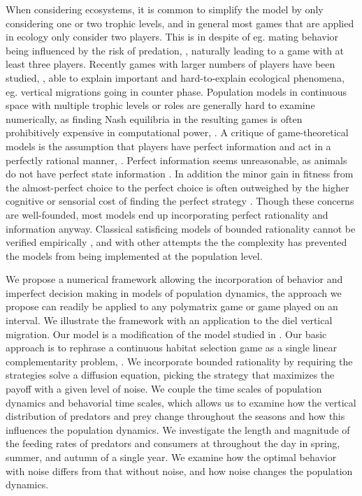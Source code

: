 When considering ecosystems, it is common to simplify the model by only considering one or two trophic levels, and in general most games that are applied in ecology only consider two players. This is in despite of eg. mating behavior being influenced by the risk of predation, \citep{carranza1999red,lima2009predators}, naturally leading to a game with at least three players. Recently games with larger numbers of players have been studied, \citep{pinti2019trophic}, able to explain important and hard-to-explain ecological phenomena, eg. vertical migrations going in counter phase. Population models in continuous space with multiple trophic levels or roles are generally hard to examine numerically, as finding Nash equilibria in the resulting games is often prohibitively expensive in computational power, \citep{empirical_trait,pinti2019trophic}. A critique of game-theoretical models is the assumption that players have perfect information and act in a perfectly rational manner, \citep{jones1999bounded}. Perfect information seems unreasonable, as animals do not have perfect state information \citep{simon1955behavioral}. In addition the minor gain in fitness from the almost-perfect choice to the perfect choice is often outweighed by the higher cognitive or sensorial cost of finding the perfect strategy \citep{simon1956rational, cohen2019bounded}. Though these concerns are well-founded, most models end up incorporating perfect rationality and information anyway. Classical satisficing models of bounded rationality cannot be verified empirically \citep{nonacs1993satisficing}, and with other attempts the \citep{bayesianmodel, thuijsman1995automata} the complexity has prevented the models from being implemented at the population level.




We propose a numerical framework allowing the incorporation of behavior and imperfect decision making in models of population dynamics, the approach we propose can readily be applied to any polymatrix game or game played on an interval. We illustrate the framework with an application to the diel vertical migration. Our model is a modification of the model studied in \citep{verticalmigration}. Our basic approach is to rephrase a continuous habitat selection game as a single linear complementarity problem, \citep{miller1991copositive}. We incorporate bounded rationality by requiring the strategies solve a diffusion equation, picking the strategy that maximizes the payoff with a given level of noise.
We couple the time scales of population dynamics and behavorial time scales, which allows us to examine how the vertical distribution of predators and prey change throughout the seasons and how this influences the population dynamics. We investigate the length and magnitude of the feeding rates of predators and consumers at throughout the day in spring, summer, and autumn of a single year. We examine how the optimal behavior with noise differs from that without noise, and how noise changes the population dynamics.


